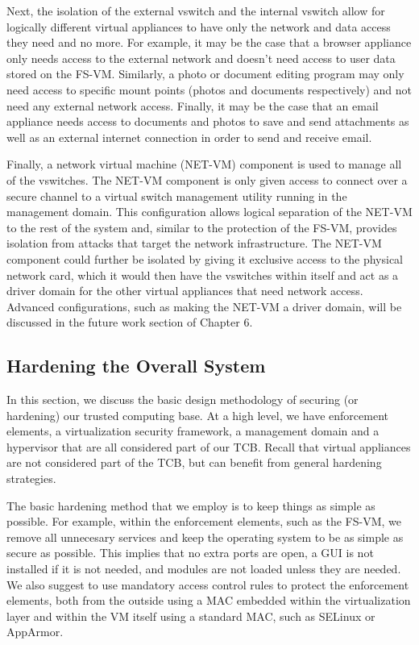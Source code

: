 Next, the isolation of the external vswitch and the internal vswitch allow for logically different virtual appliances to have only the network and data access they need and no more. For example, it may be the case that a browser appliance only needs access to the external network and doesn't need access to user data stored on the FS-VM. Similarly, a photo or document editing program may only need access to specific mount points (photos and documents respectively) and not need any external network access. Finally, it may be the case that an email appliance needs access to documents and photos to save and send attachments as well as an external internet connection in order to send and receive email.

Finally, a network virtual machine (NET-VM) component is used to manage all of the vswitches. The NET-VM component is only given access to connect over a secure channel to a virtual switch management utility running in the management domain. This configuration allows logical separation of the NET-VM to the rest of the system and, similar to the protection of the FS-VM, provides isolation from attacks that target the network infrastructure. The NET-VM component could further be isolated by giving it exclusive access to the physical network card, which it would then have the vswitches within itself and act as a driver domain for the other virtual appliances that need network access. Advanced configurations, such as making the NET-VM a driver domain, will be discussed in the future work section of Chapter 6.

\subsection{Hardening the Overall System}

In this section, we discuss the basic design methodology of securing (or hardening) our trusted computing base. At a high level, we have enforcement elements, a virtualization security framework, a management domain and a hypervisor that are all considered part of our TCB. Recall that virtual appliances are not considered part of the TCB, but can benefit from general hardening strategies.

The basic hardening method that we employ is to keep things as simple as possible. For example, within the enforcement elements, such as the FS-VM, we remove all unnecesary services and keep the operating system to be as simple as secure as possible. This implies that no extra ports are open, a GUI is not installed if it is not needed, and modules are not loaded unless they are needed. We also suggest to use mandatory access control rules to protect the enforcement elements, both from the outside using a MAC embedded within the virtualization layer and within the VM itself using a standard MAC, such as SELinux or AppArmor.

